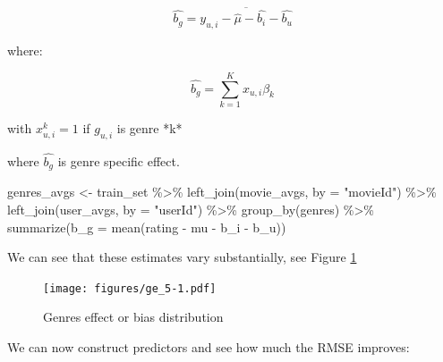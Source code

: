 \documentclass[
]{article}
\newenvironment{Shaded}{}{}
\newcommand{\AttributeTok}[1]{\textcolor[rgb]{0.49,0.56,0.16}{#1}}
\newcommand{\FunctionTok}[1]{\textcolor[rgb]{0.02,0.16,0.49}{#1}}
\newcommand{\NormalTok}[1]{#1}
\newcommand{\OtherTok}[1]{\textcolor[rgb]{0.00,0.44,0.13}{#1}}
\newcommand{\SpecialCharTok}[1]{\textcolor[rgb]{0.25,0.44,0.63}{#1}}
\newcommand{\StringTok}[1]{\textcolor[rgb]{0.25,0.44,0.63}{#1}}
\begin{document}
\label{eq:EqModel4-3} \begin{equation}
  \hat{b_{g}} = \overline{y_{u,i} - \hat{\mu} - \hat{b_{i}} - \hat{b_{u}}}
\end{equation}

where:

%
\par

\label{eq:EqModel4-4} \begin{equation}
  \hat{b_{g}} = \sum_{k=1}^Kx_{u,i}\beta_k
\end{equation}

\begin{center}
with $x_{u,i}^k=1$ if $g_{u,i}$ is genre *k*
\end{center}

where \(\hat{b_{g}}\) is genre specific effect.

\begin{Shaded}
\begin{Highlighting}[]
\NormalTok{genres\_avgs }\OtherTok{\textless{}{-}}\NormalTok{ train\_set }\SpecialCharTok{\%\textgreater{}\%} \FunctionTok{left\_join}\NormalTok{(movie\_avgs, }\AttributeTok{by =} \StringTok{"movieId"}\NormalTok{) }\SpecialCharTok{\%\textgreater{}\%} 
    \FunctionTok{left\_join}\NormalTok{(user\_avgs, }\AttributeTok{by =} \StringTok{"userId"}\NormalTok{) }\SpecialCharTok{\%\textgreater{}\%} \FunctionTok{group\_by}\NormalTok{(genres) }\SpecialCharTok{\%\textgreater{}\%} 
    \FunctionTok{summarize}\NormalTok{(}\AttributeTok{b\_g =} \FunctionTok{mean}\NormalTok{(rating }\SpecialCharTok{{-}}\NormalTok{ mu }\SpecialCharTok{{-}}\NormalTok{ b\_i }\SpecialCharTok{{-}}\NormalTok{ b\_u))}
\end{Highlighting}
\end{Shaded}

We can see that these estimates vary substantially, see Figure
\ref{fig:model_4}

\begin{figure}
\centering
\texttt{[image: figures/ge\_5-1.pdf]}
\caption{Genres effect or bias distribution\label{fig:model_4}}
\end{figure}

We can now construct predictors and see how much the RMSE improves:
\end{document}
